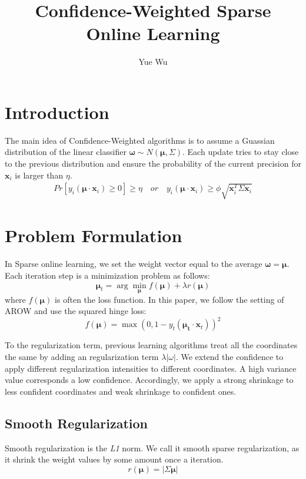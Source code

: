 \documentclass{article}
\begin{document}
\title{Confidence-Weighted Sparse Online Learning}
\author{Yue Wu}
\maketitle

\section{Introduction}
The main idea of Confidence-Weighted algorithms is to assume a Guassian distribution 
of the linear classifier $\bm{\omega}\sim N(\bm{\mu},\Sigma)$. Each update
tries to stay close to the previous distribution and ensure the
probability of the current precision for $\bm{x}_i$ is larger than
$\eta$.
\begin{equation}
  \begin{aligned}
    Pr[y_i(\bm{\mu}\cdot \bm{x}_i) \geq 0]  \geq \eta \quad or \quad
    y_i(\bm{\mu}\cdot \bm{x}_i)  \geq  \phi\sqrt{\bm{x}_i^T\Sigma\bm{x}_i}
  \end{aligned}
  \label{equ:01}
\end{equation}

\section{Problem Formulation}
In Sparse online learning, we set the weight vector equal to the average
$\bm{\omega} = \bm{\mu}$. Each iteration step is a minimization problem as follows:
\begin{equation}
    \bm{\mu}_{t} = \arg\min_{\bm{\mu}}{f(\bm{\mu}) + \lambda r(\bm{\mu})}
    \label{equ:02}
\end{equation}
where $f(\bm{\mu})$ is often the loss function. In this paper, we follow the
setting of AROW and use the squared hinge loss:
\begin{equation}
    f(\bm{\mu}) = \max(0, 1 - y_t (\bm{\mu_t}\cdot \bm{x}_t))^2
    \label{equ:03}
\end{equation}

To the regularization term, previous learning algorithms treat all the
coordinates the same by adding an regularization term
$\lambda|\omega|$. We extend the confidence to apply different
regularization intensities to different coordinates. A high variance value
corresponds a low confidence.  Accordingly, we apply a strong shrinkage to
less confident coordinates and weak shrinkage to confident ones.

\subsection{Smooth Regularization}
Smooth regularization is the \textit{L1} norm. We call it smooth 
sparse regularization, as it shrink the weight values by some amount once a
iteration.
\begin{equation}
    r(\bm{\mu})  = |\Sigma\bm{\mu}|
    \label{equ:04}
\end{equation}
\end{document}
